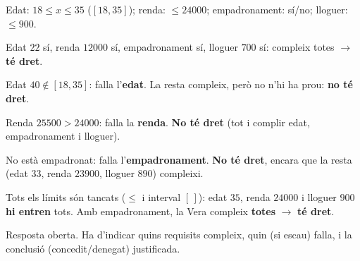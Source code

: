 \begin{solucions}
\begin{sollist}
  \item Edat: $18\le x\le 35$ ($[18,35]$); renda: $\le\num{24000}$; empadronament:
        sí/no; lloguer: $\le 900$.
  \item Edat $22$ sí, renda $\num{12000}$ sí, empadronament sí, lloguer $700$ sí:
        compleix totes $\rightarrow$ \textbf{té dret}.
  \item Edat $40\notin[18,35]$: falla l'\textbf{edat}. La resta compleix, però no
        n'hi ha prou: \textbf{no té dret}.
  \item Renda $\num{25500}>\num{24000}$: falla la \textbf{renda}. \textbf{No té dret}
        (tot i complir edat, empadronament i lloguer).
  \item No està empadronat: falla l'\textbf{empadronament}. \textbf{No té dret},
        encara que la resta (edat $33$, renda $\num{23900}$, lloguer $890$) compleixi.
  \item Tots els límits són tancats ($\le$ i interval $[\,]$): edat $35$, renda
        $\num{24000}$ i lloguer $900$ \textbf{hi entren} tots. Amb empadronament, la
        Vera compleix \textbf{totes} $\rightarrow$ \textbf{té dret}.
  \item Resposta oberta. Ha d'indicar quins requisits compleix, quin (si escau) falla,
        i la conclusió (concedit/denegat) justificada.
\end{sollist}
\end{solucions}
